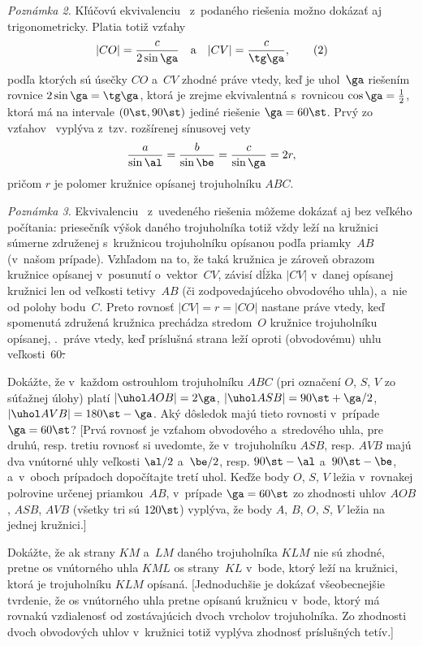 {\smallskip
{\it Poznámka 2.}
Kľúčovú ekvivalenciu~ z~podaného riešenia
možno dokázať aj trigonometricky.
Platia totiž vzťahy
$$
|CO|=\frac{c}{2\sin\ga}\quad\text{a}\quad
|CV|=\frac{c}{\tg\ga},         \tag2
$$
podľa ktorých sú úsečky $CO$ a~$CV$ zhodné práve vtedy, keď je uhol~$\ga$ riešením rovnice $2\sin\ga=\tg\ga$, ktorá je zrejme ekvivalentná s~rovnicou $\cos\ga=\frac12$, ktorá má na intervale
$(0\st,90\st)$ jediné riešenie $\ga=60\st$. Prvý zo vzťahov~
vyplýva z~tzv. rozšírenej sínusovej vety
$$
\frac{a}{\sin\al}=\frac{b}{\sin\be}=\frac{c}{\sin\ga}=2r,
$$
pričom $r$ je polomer kružnice opísanej trojuholníku $ABC$.

\smallskip
{\it Poznámka 3.}
Ekvivalenciu~ z~uvedeného riešenia môžeme dokázať
aj bez veľkého počítania: priesečník výšok daného trojuholníka totiž
vždy leží na kružnici súmerne združenej s~kružnicou trojuholníku opísanou podľa
priamky~$AB$ (v~našom prípade). Vzhľadom na to, že taká kružnica je zároveň
obrazom kružnice opísanej v~posunutí o~vektor~$CV$,
závisí dĺžka $|CV|$ v~danej opísanej kružnici len od veľkosti tetivy~$AB$
(či zodpovedajúceho obvodového uhla), a~nie od polohy bodu~$C$. Preto
rovnosť $|CV|=r=|CO|$ nastane
práve vtedy, keď spomenutá združená kružnica prechádza stredom~$O$ kružnice trojuholníku opísanej,
\tj.~práve vtedy, keď príslušná strana leží oproti (obvodovému) uhlu veľkosti~60\st.


Dokážte, že v~každom ostrouhlom trojuholníku $ABC$ (pri označení $O$, $S$, $V$
zo súťažnej úlohy) platí $|\uhol AOB|=2\ga$,
$|\uhol ASB|=90\st+\ga/2$, $|\uhol AVB|=180\st-\ga$. Aký dôsledok
majú tieto rovnosti v~prípade $\ga=60\st$? [Prvá rovnosť
je vzťahom obvodového a~stredového uhla, pre druhú, resp. tretiu
rovnosť si uvedomte, že v~trojuholníku $ASB$, resp. $AVB$ majú dva vnútorné
uhly veľkosti $\al/2$ a~$\be/2$, resp. $90\st-\al$
a~$90\st-\be$, a~v~oboch prípadoch dopočítajte tretí uhol. Keďže
body $O$, $S$, $V$ ležia v~rovnakej polrovine určenej priamkou~$AB$,
v~prípade $\ga=60\st$ zo zhodnosti uhlov $AOB$, $ASB$, $AVB$
(všetky tri sú $120\st$) vyplýva,
že body $A$, $B$, $O$, $S$, $V$ ležia na jednej kružnici.]

Dokážte, že ak strany $KM$ a~$LM$ daného trojuholníka $KLM$ nie sú zhodné, pretne
os vnútorného uhla $KML$ os strany~$KL$ v~bode, ktorý leží na
kružnici, ktorá je trojuholníku $KLM$ opísaná. [Jednoduchšie je dokázať
všeobecnejšie tvrdenie, že os vnútorného uhla pretne opísanú
kružnicu v~bode, ktorý má rovnakú vzdialenosť od zostávajúcich dvoch
vrcholov trojuholníka. Zo zhodnosti dvoch obvodových uhlov v~kružnici
totiž vyplýva zhodnosť príslušných tetív.]

}
